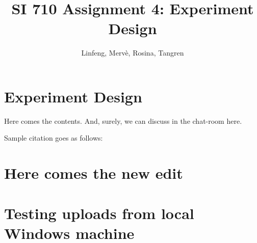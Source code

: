 \documentclass{article}
\title{SI 710 Assignment 4: Experiment Design}
\author{Linfeng, Merv\`e, Rosina, Tangren}
\date{}
\begin{document}
\maketitle

\section{Experiment Design}

Here comes the contents. And, surely, we can discuss in the chat-room here.

Sample citation goes as follows: \cite{adams1995hitchhiker}


\section{Here comes the new edit}

\section{Testing uploads from local Windows machine}



\end{document}
